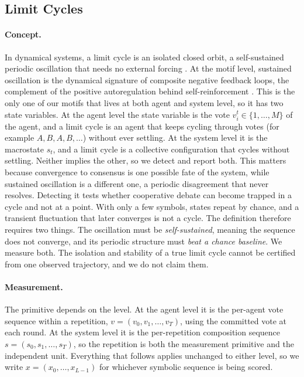 \subsection{Limit Cycles}
\label{sec:method:lc}

\paragraph{Concept.}
In dynamical systems, a limit cycle is an isolated closed orbit, a self-sustained
periodic oscillation that needs no external forcing
\citep{strogatz2015nonlinear}. At the motif level, sustained oscillation is the
dynamical signature of composite negative feedback loops, the complement of the positive
autoregulation behind self-reinforcement \citep{alon2007network}.
This is the only one of our motifs that lives at both agent and system level, so
it has two state variables. At the agent level the state variable is the
vote $v_i^t \in \{1,\ldots,M\}$ of the agent, and a limit cycle is an agent that keeps cycling
through votes (for example $A, B, A, B, \ldots$) without ever settling. At the
system level it is the macrostate $s_t$, and a limit cycle is a collective
configuration that cycles without settling. Neither implies the other, so we detect
and report both. This matters because convergence to consensus is one possible
fate of the system, while sustained oscillation is a different one, a periodic
disagreement that never resolves. Detecting it tests whether cooperative debate can
become trapped in a cycle and not at a point. With only a few symbols, states repeat
by chance, and a transient fluctuation that later converges is not a cycle. The
definition therefore requires two things. The oscillation must be
\emph{self-sustained}, meaning the sequence does not converge, and its periodic
structure must \emph{beat a chance baseline}. We measure both. The isolation and
stability of a true limit cycle cannot be certified from one observed trajectory,
and we do not claim them.

\paragraph{Measurement.}
The primitive depends on the level. At the agent level it is the per-agent vote
sequence within a repetition, $v = (v_0, v_1, \ldots, v_T)$, using the committed
\updatephase{} vote at each round. At the system level it is the per-repetition
composition sequence $s = (s_0, s_1, \ldots, s_T)$, so the repetition is both the
measurement primitive and the independent unit. Everything that follows applies
unchanged to either level, so we write $x = (x_0, \ldots, x_{L-1})$ for whichever
symbolic sequence is being scored.

